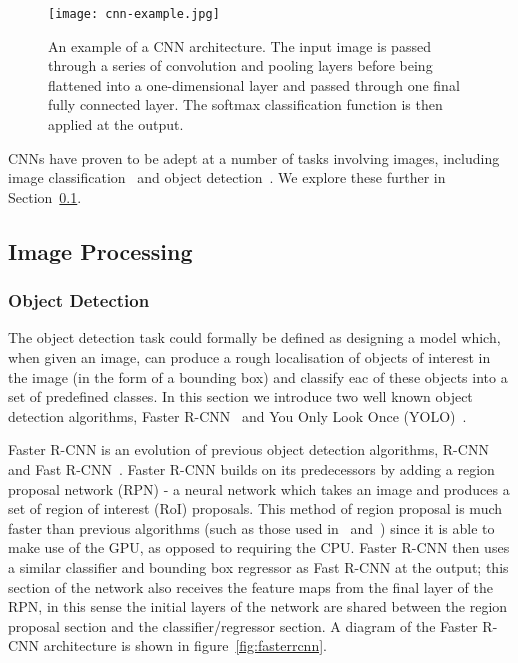 \documentclass[../interim.tex]{subfiles}
\begin{document}
\begin{figure}
  \centering
  \texttt{[image: cnn-example.jpg]}
  \caption{An example of a CNN architecture. The input image is passed through a series of convolution and pooling layers before being flattened into a one-dimensional layer and passed through one final fully connected layer. The softmax classification function is then applied at the output.}
  \label{fig:example-cnn}
\end{figure}

CNNs have proven to be adept at a number of tasks involving images, including image classification~\cite{cnn-uses:classification} and object detection~\cite{cnn-uses:yolo-v3, cnn-uses:faster-r-cnn}. We explore these further in Section~\ref{section:image-proc}.


\subsection{Image Processing}
\label{section:image-proc}

\subsubsection{Object Detection}

The object detection task could formally be defined as designing a model which, when given an image, can produce a rough localisation of objects of interest in the image (in the form of a bounding box) and classify eac of these objects into a set of predefined classes. In this section we introduce two well known object detection algorithms, Faster R-CNN~\cite{cnn-uses:faster-r-cnn} and You Only Look Once (YOLO)~\cite{cnn-uses:yolo-v3}.

Faster R-CNN is an evolution of previous object detection algorithms, R-CNN~\cite{r-cnn} and Fast R-CNN~\cite{fast-r-cnn}. Faster R-CNN builds on its predecessors by adding a region proposal network (RPN) - a neural network which takes an image and produces a set of region of interest (RoI) proposals. This method of region proposal is much faster than previous algorithms (such as those used in~\cite{r-cnn} and~\cite{fast-r-cnn}) since it is able to make use of the GPU, as opposed to requiring the CPU. Faster R-CNN then uses a similar classifier and bounding box regressor as Fast R-CNN at the output; this section of the network also receives the feature maps from the final layer of the RPN, in this sense the initial layers of the network are shared between the region proposal section and the classifier/regressor section. A diagram of the Faster R-CNN architecture is shown in figure~\ref{fig:fasterrcnn}.
\end{document}
